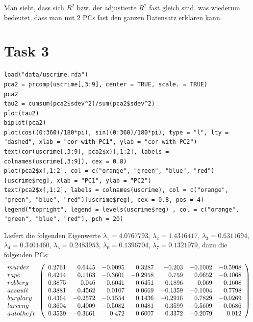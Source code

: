 \documentclass{article}
\begin{document}
	Man sieht, dass sich $R^2$ bzw. der adjustierte $R^2$ fast gleich sind, was wiederum bedeutet, dass man mit 2 PCs fast den ganzen Datensatz erklären kann.
	
	\section*{Task 3}
	\begin{lstlisting}
load("data/uscrime.rda")
pca2 = prcomp(uscrime[,3:9], center = TRUE, scale. = TRUE)
pca2
tau2 = cumsum(pca2$sdev^2)/sum(pca2$sdev^2)
plot(tau2)
biplot(pca2)
plot(cos((0:360)/180*pi), sin((0:360)/180*pi), type = "l", lty = "dashed", xlab = "cor with PC1", ylab = "cor with PC2")
text(cor(uscrime[,3:9], pca2$x)[,1:2], labels = colnames(uscrime[,3:9]), cex = 0.8)
plot(pca2$x[,1:2], col = c("orange", "green", "blue", "red")[uscrime$reg], xlab = "PC1", ylab = "PC2")
text(pca2$x[,1:2], labels = colnames(uscrime), col = c("orange", "green", "blue", "red")[uscrime$reg], cex = 0.8, pos = 4)
legend("topright", legend = levels(uscrime$reg) , col = c("orange", "green", "blue", "red"), pch = 20)
	\end{lstlisting}
	Liefert die folgenden Eigenwerte $\lambda_1 = 4.0767793$, $\lambda_2 = 1.4316417$, $\lambda_3 = 0.6311694$, $\lambda_4 = 0.3401460$, $\lambda_5 = 0.2483953$, $\lambda_6 = 0.1396704$, $\lambda_7 = 0.1321979$, dazu die folgenden PCs:
	\begin{align}
		\begin{array}{l}
			murder \\
			rape \\
			robbery \\
			assault \\
			burglary \\
			larceny \\
			autotheft
		\end{array}
		\left(\begin{array}{rrrrrrr}
			0.2761 & 0.6445 & -0.0095 & 0.3287 & -0.203 & -0.1002 & -0.5908 \\ 0.4214 & 0.1163 & -0.3601 & -0.2958 & 0.759 & 0.0652 & -0.1068 \\ 0.3875 & -0.046 & 0.6041 & -0.6451 & -0.1896 & -0.069 & -0.1608 \\ 0.3881 & 0.4562 & 0.0107 & 0.0669 & -0.1359 & -0.1004 & 0.7798 \\ 0.4364 & -0.2572 & -0.1554 & 0.1436 & -0.2916 & 0.7829 & -0.0269 \\ 0.3604 & -0.4009 & -0.5082 & -0.0481 & -0.3599 & -0.5609 & -0.0686 \\ 0.3539 & -0.3661 & 0.472 & 0.6007 & 0.3372 & -0.2079 & 0.012
		\end{array}\right) \notag
	\end{align}
\end{document}
